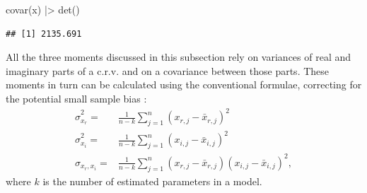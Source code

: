 \documentclass[
]{book}
\newenvironment{Shaded}{\begin{snugshade}}{\end{snugshade}}
\newcommand{\FunctionTok}[1]{\textcolor[rgb]{0.00,0.00,0.00}{#1}}
\newcommand{\NormalTok}[1]{#1}
\newcommand{\SpecialCharTok}[1]{\textcolor[rgb]{0.00,0.00,0.00}{#1}}
\begin{document}
\begin{Shaded}
\begin{Highlighting}[]
\FunctionTok{covar}\NormalTok{(x) }\SpecialCharTok{|\textgreater{}} \FunctionTok{det}\NormalTok{()}
\end{Highlighting}
\end{Shaded}

\begin{verbatim}
## [1] 2135.691
\end{verbatim}

All the three moments discussed in this subsection rely on variances of real and imaginary parts of a c.r.v. and on a covariance between those parts. These moments in turn can be calculated using the conventional formulae, correcting for the potential small sample bias \citep{referenceSBA}:
\begin{equation}
    \begin{aligned}
        \hat{\sigma}_{x_r}^2 = & \frac{1}{n-k} \sum_{j=1}^n (x_{r,j}-\bar{x}_{r,j})^2 \\
        \hat{\sigma}_{x_i}^2 = & \frac{1}{n-k} \sum_{j=1}^n (x_{i,j}-\bar{x}_{i,j})^2 \\
        \hat{\sigma}_{x_r, x_i} = & \frac{1}{n-k} \sum_{j=1}^n (x_{r,j}-\bar{x}_{r,j})(x_{i,j}-\bar{x}_{i,j})^2 ,
    \end{aligned}
    \label{eq:crvMomentSecondSample}
\end{equation}
where \(k\) is the number of estimated parameters in a model.
\end{document}

